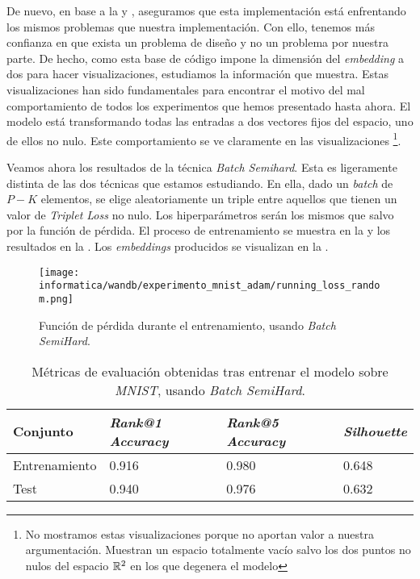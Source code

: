 De nuevo, en base a la  y , aseguramos que esta implementación está enfrentando los mismos problemas que nuestra implementación. Con ello, tenemos más confianza en que exista un problema de diseño y no un problema por nuestra parte. De hecho, como esta base de código impone la dimensión del \textit{embedding} a dos para hacer visualizaciones, estudiamos la información que muestra. Estas visualizaciones han sido fundamentales para encontrar el motivo del mal comportamiento de todos los experimentos que hemos presentado hasta ahora. El modelo está transformando todas las entradas a dos vectores fijos del espacio, uno de ellos no nulo. Este comportamiento se ve claramente en las visualizaciones \footnote{No mostramos estas visualizaciones porque no aportan valor a nuestra argumentación. Muestran un espacio totalmente vacío salvo los dos puntos no nulos del espacio $\mathbb{R}^2$ en los que degenera el modelo}.

Veamos ahora los resultados de la técnica \textit{Batch Semihard}. Esta es ligeramente distinta de las dos técnicas que estamos estudiando. En ella, dado un \textit{batch} de $P-K$ elementos, se elige aleatoriamente un triple entre aquellos que tienen un valor de \textit{Triplet Loss} no nulo. Los hiperparámetros serán los mismos que  salvo por la función de pérdida. El proceso de entrenamiento se muestra en la  y los resultados en la . Los \textit{embeddings} producidos se visualizan en la .

\begin{figure}[!hbtp]
    \centering
    \texttt{[image: informatica/wandb/experimento\_mnist\_adam/running\_loss\_random.png]}
    \caption{Función de pérdida durante el entrenamiento, usando \textit{Batch SemiHard}.}
    \label{img:proceso_entrenamiento_adam_mnist_random}
\end{figure}

\begin{table}[!hbtp]
\centering
\begin{tabular}{|l|l|l|l|}
    \hline
    Conjunto & \textit{Rank@1 Accuracy} & \textit{Rank@5 Accuracy} & \textit{Silhouette} \\
    \hline

    Entrenamiento & 0.916 & 0.980 & 0.648 \\
    Test & 0.940 & 0.976 & 0.632 \\

    \hline


\end{tabular}
\caption{Métricas de evaluación obtenidas tras entrenar el modelo sobre \textit{MNIST}, usando \textit{Batch SemiHard}.}
\label{table:resultados_adam_mnist_random}
\end{table}

